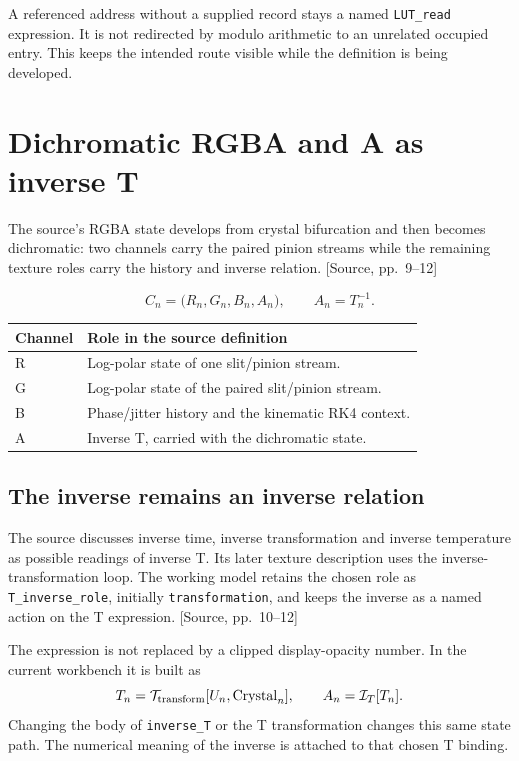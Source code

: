 \documentclass[11pt,a4paper]{article}
\newcommand{\src}[1]{{\sffamily\footnotesize\color{DWGray}[Source, pp.~#1]}}
\newcommand{\code}[1]{\texttt{#1}}
\begin{document}
A referenced address without a supplied record stays a named \code{LUT\_read} expression. It is not redirected by modulo arithmetic to an unrelated occupied entry. This keeps the intended route visible while the definition is being developed.
\clearpage

\section{Dichromatic RGBA and A as inverse T}\label{sec:rgba}
The source's RGBA state develops from crystal bifurcation and then becomes dichromatic: two channels carry the paired pinion streams while the remaining texture roles carry the history and inverse relation. \src{9--12}

\begin{equation}
C_n=\bigl(R_n,G_n,B_n,A_n\bigr),
\qquad \boxed{A_n=T_n^{-1}.}
\end{equation}

\begin{tabularx}{\linewidth}{@{}P{17mm}Y@{}}
\toprule
\textbf{Channel} & \textbf{Role in the source definition}\\
\midrule
R & Log-polar state of one slit/pinion stream.\\
G & Log-polar state of the paired slit/pinion stream.\\
B & Phase/jitter history and the kinematic RK4 context.\\
A & Inverse T, carried with the dichromatic state.\\
\bottomrule
\end{tabularx}

\subsection{The inverse remains an inverse relation}
The source discusses inverse time, inverse transformation and inverse temperature as possible readings of inverse T. Its later texture description uses the inverse-transformation loop. The working model retains the chosen role as \code{T\_inverse\_role}, initially \code{transformation}, and keeps the inverse as a named action on the T expression. \src{10--12}

The expression is not replaced by a clipped display-opacity number. In the current workbench it is built as
\begin{equation}
T_n=\mathcal{T}_{\rm transform}[U_n,\operatorname{Crystal}_n],
\qquad A_n=\mathcal{I}_T[T_n].
\end{equation}
Changing the body of \code{inverse\_T} or the T transformation changes this same state path. The numerical meaning of the inverse is attached to that chosen T binding.
\end{document}
